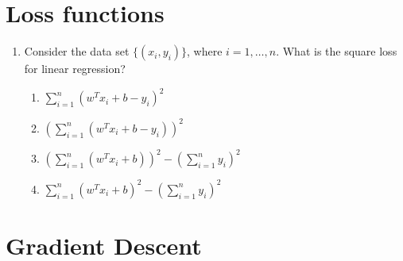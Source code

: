 \documentclass[twoside]{article}
\begin{document}
\section{Loss functions}

\begin{enumerate}
\item Consider the data set $\{(x_i, y_i)\}$, where $i=1,\ldots,n$. What is the square loss for linear regression?
\begin{enumerate}
\item $\displaystyle\sum_{i=1}^n(w^Tx_i+b-y_i)^2$
\item $\left(\displaystyle\sum_{i=1}^n(w^Tx_i+b-y_i)\right)^2$
\item $\left(\displaystyle\sum_{i=1}^n(w^Tx_i+b)\right)^2-\left(\displaystyle\sum_{i=1}^ny_i\right)^2$
\item $\displaystyle\sum_{i=1}^n(w^Tx_i+b)^2-\left(\displaystyle\sum_{i=1}^ny_i\right)^2$
\end{enumerate}

\end{enumerate}

\section{Gradient Descent}
\end{document}
